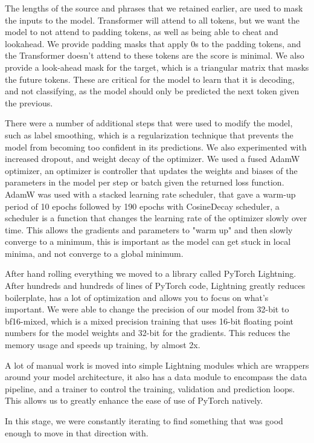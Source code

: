 \documentclass[preprint,11pt,review,authoryear]{elsarticle}
\begin{document}
The lengths of the source and phrases that we retained earlier, are used to mask the inputs to the model. Transformer will attend to all tokens, but we want the model to not attend to padding tokens, as well as being able to cheat and lookahead. We provide padding masks that apply 0s to the padding tokens, and the Transformer doesn't attend to these tokens are the score is minimal. We also provide a look-ahead mask for the target, which is a triangular matrix that masks the future tokens. These are critical for the model to learn that it is decoding, and not classifying, as the model should only be predicted the next token given the previous.

There were a number of additional steps that were used to modify the model, such as label smoothing, which is a regularization technique that prevents the model from becoming too confident in its predictions. We also experimented with increased dropout, and weight decay of the optimizer. We used a fused AdamW optimizer, an optimizer is controller that updates the weights and biases of the parameters in the model per step or batch given the returned loss function. AdamW was used with a stacked learning rate scheduler, that gave a warm-up period of 10 epochs followed by 190 epochs with CosineDecay scheduler, a scheduler is a function that changes the learning rate of the optimizer slowly over time. This allows the gradients and parameters to "warm up" and then slowly converge to a minimum, this is important as the model can get stuck in local minima, and not converge to a global minimum.

After hand rolling everything we moved to a library called PyTorch Lightning. After hundreds and hundreds of lines of PyTorch code, Lightning \citep{williamfalconWelcomePyTorchLightning} greatly reduces boilerplate, has a lot of optimization and allows you to focus on what's important. We were able to change the precision of our model from 32-bit to bf16-mixed, which is a mixed precision training that uses 16-bit floating point numbers for the model weights and 32-bit for the gradients. This reduces the memory usage and speeds up training, by almost 2x.

A lot of manual work is moved into simple Lightning modules which are wrappers around your model architecture, it also has a data module to encompass the data pipeline, and a trainer to control the training, validation and prediction loops. This allows us to greatly enhance the ease of use of PyTorch natively.

In this stage, we were constantly iterating to find something that was good enough to move in that direction with.
\end{document}
